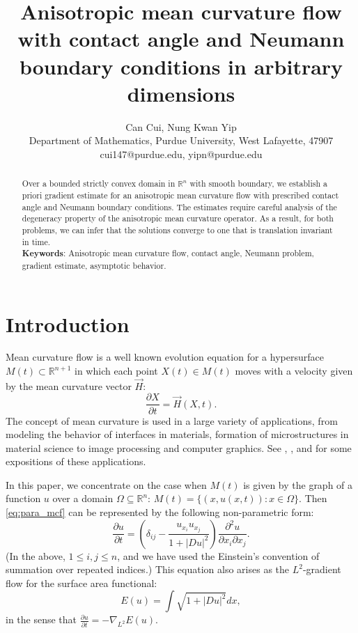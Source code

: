 \documentclass[12pt]{article}
\title{Anisotropic mean curvature flow with contact angle and Neumann boundary conditions in arbitrary dimensions}
\date{}
\numberwithin{equation}{section}
\theoremstyle{plain}
\theoremstyle{definition}
\theoremstyle{remark}
\begin{document}
\author{Can Cui, Nung Kwan Yip \\
Department of Mathematics, Purdue University, West Lafayette, 47907 \\
cui147@purdue.edu, yipn@purdue.edu
}

\maketitle

\begin{abstract}
Over a bounded strictly convex domain in $\mathbb{R}^n$ with smooth boundary, we establish a priori gradient estimate for an anisotropic mean curvature flow with prescribed contact angle and Neumann boundary conditions. The estimates require careful analysis of the degeneracy property of the anisotropic mean curvature
operator. As a result, for both problems, we can infer that the solutions converge to one that is translation invariant in time. \\

\noindent
\textbf{Keywords}: Anisotropic mean curvature flow, contact angle, Neumann problem, gradient estimate, asymptotic behavior.
\end{abstract}




\section{Introduction} \label{sec:1}
Mean curvature flow is a well known evolution equation for a hypersurface $M(t) \subset \mathbb{R}^{n+1}$ in which each point $X(t)\in M(t)$ moves with a velocity given by the mean curvature vector $\Vec{H}$:
\begin{equation} \label{eq:para_mcf}
\frac{\partial X}{\partial t}=\Vec{H}(X,t).
\end{equation} 
The concept of mean curvature is used in a large variety of applications, from modeling the behavior of  interfaces in materials,  formation of microstructures in material science to image processing and computer graphics. See \cite{Mu}, \cite{Ta}, \cite{AGLM} and \cite{desbrun1999implicit} for some expositions of these applications.

In this paper, we concentrate on the case when $M(t)$ is given by the graph of a function $u$ over a domain $\Omega\subseteq\mathbb{R}^{n}$: $M(t) = \{(x,u(x,t)): x\in\Omega\}$.
Then \eqref{eq:para_mcf} can be represented by the following
non-parametric form:
\begin{equation}\label{eq:graph_mcf}
     \frac{\partial u}{\partial t} = \left( \delta_{ij} -\frac{u_{x_i} u_{x_j}}{1+|Du|^2} \right) \frac{\partial^2 u}{\partial x_i \partial x_j}.
\end{equation}
(In the above, $1\leq i, j\leq n$, and we have used the Einstein's convention of summation over repeated indices.)
This equation also arises as the $L^2$-gradient flow for the surface area functional:
\begin{equation*}
    E(u) = \int \sqrt{1+|Du|^2} dx,
\end{equation*}
in the sense that $\frac{\partial u}{\partial t} = -\nabla_{L^2} E(u)$.
\end{document}
